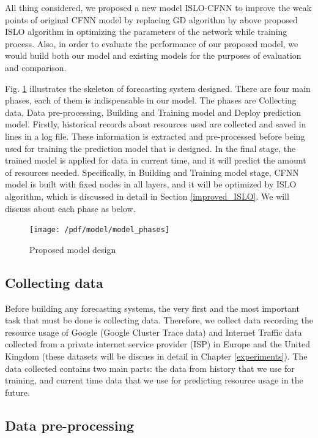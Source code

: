 \documentclass[a4paper,13pt,2p]{report}
\begin{document}
	All thing considered, we proposed a new model ISLO-CFNN to improve the weak points of original CFNN model by replacing GD algorithm by above proposed ISLO algorithm in optimizing the parameters of the network while training process. Also, in order to evaluate the performance of our proposed model, we would build both our model and existing models for the purposes of evaluation and comparison.
	
	Fig. \ref{fig_model_phases} illustrates the skeleton of forecasting system designed. There are four main phases, each of them is indispensable in our model. The phases are Collecting data, Data pre-processing, Building and Training model and Deploy prediction model. Firstly, historical records about resources used are collected and saved in lines in a log file. These information is extracted and pre-processed before being used for training the prediction model that is designed. In the final stage, the trained model is applied for data in current time, and it will predict the amount of resources needed. Specifically, in Building and Training model stage, CFNN model is built with fixed nodes in all layers, and it will be optimized by ISLO algorithm, which is discussed in detail in Section \ref{improved_ISLO}. We will discuss about each phase as below.
	
\begin{figure}[!ht] 
   \centering
   \texttt{[image: /pdf/model/model\_phases]}
  \caption{Proposed model design} 
  \label{fig_model_phases} 
\end{figure}
	
\subsection{Collecting data}
\label{collect_data}
	
	Before building any forecasting systems, the very first and the most important task that must be done is collecting data. Therefore, we collect data recording the resource usage of Google (Google Cluster Trace data) and Internet Traffic data collected from a private internet service provider (ISP) in Europe and the United Kingdom (these datasets  will be discuss in detail in Chapter \ref{experiments}). The data collected contains two main parts: the data from history that we use for training, and current time data that we use for predicting resource usage in the future.  
	

\subsection{Data pre-processing}
\label{data-pre}
\end{document}
